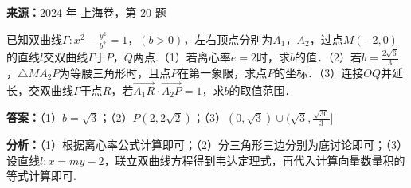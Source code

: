 \begin{question}[points=18]
\textbf{来源：}2024 年 上海卷，第 20 题\par
已知双曲线$\Gamma:x^2-\frac{y^2}{b^2}=1$，$(b>0)$，左右顶点分别为$A_1$，$A_2$，过点$M(-2,0)$的直线$l$交双曲线$\Gamma$于$P$，$Q$两点.（1）若离心率$e=2$时，求$b$的值．（2）若$b=\frac{2\sqrt6}{3}$，$\triangle MA_2P$为等腰三角形时，且点$P$在第一象限，求点$P$的坐标．（3）连接$OQ$并延长，交双曲线$\Gamma$于点$R$，若$\overrightarrow{A_1R}\cdot\overrightarrow{A_2P}=1$，求$b$的取值范围．
\begin{solution}
\textbf{答案：}（1）$b=\sqrt3$；（2）$P(2,2\sqrt2)$；（3）$(0,\sqrt3)\cup(\sqrt3,\frac{\sqrt{30}}{3}]$

\textbf{分析：}（1）根据离心率公式计算即可；（2）分三角形三边分别为底讨论即可；（3）设直线$l:x=my-2$，联立双曲线方程得到韦达定理式，再代入计算向量数量积的等式计算即可.


\end{solution}
\end{question}
